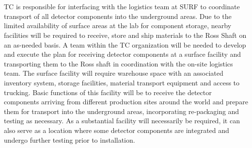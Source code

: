 \section{}
\label{sec:fdsp-coord-integ-test}

 TC is responsible for interfacing with the  
logistics team at SURF to coordinate transport of all detector
components into the underground areas.  Due to the limited availability 
of surface areas at the lab for component storage, nearby facilities 
will be required to receive, store and ship materials to the Ross Shaft 
on an as-needed basis. A team within the TC organization will be needed 
to develop and execute the plan for receiving detector components at a 
surface facility and transporting them to the Ross shaft in coordination 
with the on-site  logistics team.  The surface facility will 
require warehouse space with an associated inventory system, storage 
facilities, material transport equipment and access to trucking.  Basic 
functions of this facility will be to receive the detector components 
arriving from different production sites around the world and prepare 
them for transport into the underground areas, incorporating re-packaging 
and testing as necessary. As a substantial facility will necessarily be 
required, it can also serve as a location where some detector components 
are integrated and undergo further testing prior to installation.  

